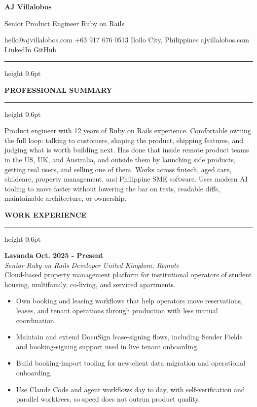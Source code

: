 \documentclass[10pt,letterpaper]{article}
\newcommand{\sectionheading}[1]{%
  \vspace{8pt}
  {\large\bfseries\MakeUppercase{#1}}\par
  \vspace{1pt}
  \hrule height 0.6pt
  \vspace{4pt}
}
\newcommand{\roleentry}[4]{%
  \Needspace{5\baselineskip}%
  \textbf{#1} \hfill \textbf{#2}\\
  \textit{#3} \hfill \textit{#4}\\[-2pt]
}
\newcommand{\roleblurb}[1]{%
  #1\\[-2pt]
}
\begin{document}
\fontsize{10.25}{11.6}\selectfont

{\fontsize{24}{26}\selectfont\bfseries AJ Villalobos}\par
\vspace{1pt}
{\large Senior Product Engineer \textbar{} Ruby on Rails}\par
\vspace{2pt}
hello@ajvillalobos.com
\hspace{0.4em}\textbar{}\hspace{0.4em}
+63 917 676 0513
\hspace{0.4em}\textbar{}\hspace{0.4em}
Iloilo City, Philippines
\hspace{0.4em}\textbar{}\hspace{0.4em}
ajvillalobos.com
\hspace{0.4em}\textbar{}\hspace{0.4em}
LinkedIn
\hspace{0.4em}\textbar{}\hspace{0.4em}
GitHub
\vspace{3pt}
\hrule height 0.6pt

\sectionheading{Professional Summary}
Product engineer with 12 years of Ruby on Rails experience. Comfortable owning the full loop: talking to customers, shaping the product, shipping features, and judging what is worth building next. Has done that inside remote product teams in the US, UK, and Australia, and outside them by launching side products, getting real users, and selling one of them. Works across fintech, aged care, childcare, property management, and Philippine SME software. Uses modern AI tooling to move faster without lowering the bar on tests, readable diffs, maintainable architecture, or ownership.

\sectionheading{Work Experience}
\roleentry{Lavanda}{Oct. 2025 - Present}{Senior Ruby on Rails Developer}{United Kingdom, Remote}
\roleblurb{Cloud-based property management platform for institutional operators of student housing, multifamily, co-living, and serviced apartments.}
\begin{itemize}
  \item Own booking and leasing workflows that help operators move reservations, leases, and tenant operations through production with less manual coordination.
  \item Maintain and extend DocuSign lease-signing flows, including Sender Fields and booking-signing support used in live tenant onboarding.
  \item Build booking-import tooling for new-client data migration and operational onboarding.
  \item Use Claude Code and agent workflows day to day, with self-verification and parallel worktrees, so speed does not outrun product quality.
\end{itemize}
\end{document}

